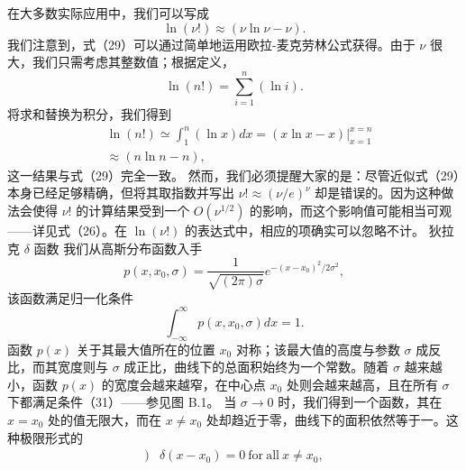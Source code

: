 在大多数实际应用中，我们可以写成
\begin{equation}\tag{17.2.30}\label{eq:17.2.30}
\ln ( \nu ! ) \approx ( \nu \ln \nu - \nu ) .
\end{equation}
我们注意到，式（29）可以通过简单地运用欧拉-麦克劳林公式获得。由于 \(\nu\) 很大，我们只需考虑其整数值；根据定义，
\begin{equation}\tag{17.2.31}\label{eq:17.2.31}
\ln ( n ! ) = \sum _ { i = 1 } ^{n} ( \ln i ) .
\end{equation}
将求和替换为积分，我们得到
\begin{equation}\tag{17.2.32}\label{eq:17.2.32}
\begin{array}{rl} & { \ln ( n ! ) \simeq \int _ { 1 } ^{n} ( \ln x ) d x = ( x \ln x - x ) \bigg | _ { x = 1 } ^{x = n} } \\& { \approx ( n \ln n - n ) , } \end{array}
\end{equation}
这一结果与式（29）完全一致。
然而，我们必须提醒大家的是：尽管近似式（29）本身已经足够精确，但将其取指数并写出 \(\nu! \approx (\nu/e)^{\nu}\) 却是错误的。因为这种做法会使得 \(\nu!\) 的计算结果受到一个 \(O(\nu^{1/2})\) 的影响，而这个影响值可能相当可观——详见式（26）。在 \(\ln(\nu!)\) 的表达式中，相应的项确实可以忽略不计。
狄拉克 \(\delta\) 函数 我们从高斯分布函数入手
\begin{equation}\tag{17.2.33}\label{eq:17.2.33}
p ( x , x _ { 0 } , \sigma ) = \frac { 1 } { \sqrt { ( 2 \pi ) \sigma } } e ^{- ( x - x _ { 0} ) ^{2} / 2 \sigma ^{2} } ,
\end{equation}
该函数满足归一化条件
\begin{equation}\tag{17.2.34}\label{eq:17.2.34}
\int _ { - \infty } ^{\infty} p ( x , x _ { 0 } , \sigma ) d x = 1 .
\end{equation}
函数 \(p(x)\) 关于其最大值所在的位置 \(x_0\) 对称；该最大值的高度与参数 \(\sigma\) 成反比，而其宽度则与 \(\sigma\) 成正比，曲线下的总面积始终为一个常数。随着 \(\sigma\) 越来越小，函数 \(p(x)\) 的宽度会越来越窄，在中心点 \(x_0\) 处则会越来越高，且在所有 \(\sigma\) 下都满足条件（31）——参见图 B.1。
当 \(\sigma \to 0\) 时，我们得到一个函数，其在 \(x = x_0\) 处的值无限大，而在 \(x \neq x_0\) 处却趋近于零，曲线下的面积依然等于一。这种极限形式的
\begin{equation}\tag{17.2.35}\label{eq:17.2.35}
\begin{array}{rl} { ) } & { { } \delta ( x - x _ { 0 } ) = 0  \mathrm { ~ f o r ~ a l l ~ } x \neq x _ { 0 } , } \end{array}
\end{equation}
